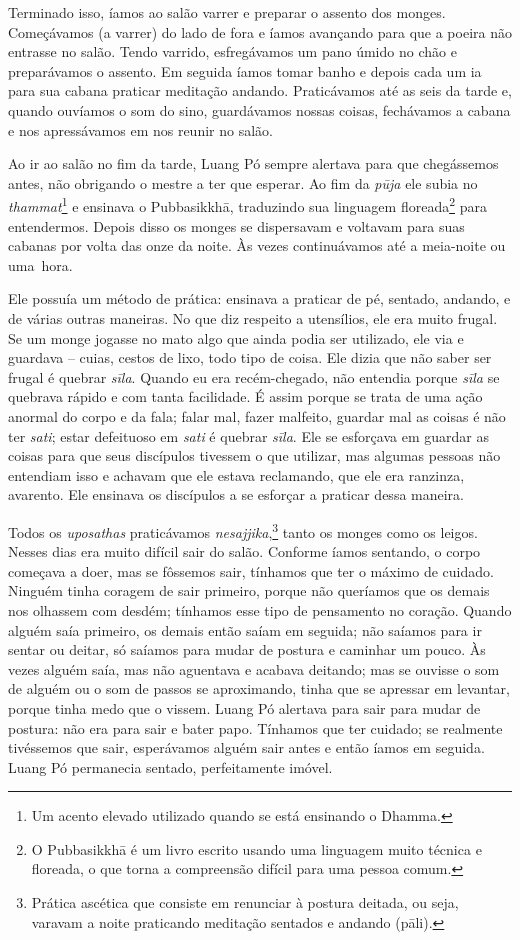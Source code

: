 Terminado isso, íamos ao salão varrer e preparar o assento dos monges.
Começávamos (a varrer) do lado de fora e íamos avançando para que a
poeira não entrasse no salão. Tendo varrido, esfregávamos um pano úmido
no chão e preparávamos o assento. Em seguida íamos tomar banho e depois
cada um ia para sua cabana praticar meditação andando. Praticávamos até
as seis da tarde e, quando ouvíamos o som do sino, guardávamos nossas
coisas, fechávamos a cabana e nos apressávamos em nos reunir no salão.

Ao ir ao salão no fim da tarde, Luang Pó sempre alertava para que
chegássemos antes, não obrigando o mestre a ter que esperar. Ao fim da
\emph{pūja} ele subia no \emph{thammat}\footnote{Um acento elevado
  utilizado quando se está ensinando o Dhamma.} e ensinava o
Pubbasikkhā, traduzindo sua linguagem floreada\footnote{O Pubbasikkhā é
  um livro escrito usando uma linguagem muito técnica e floreada, o que
  torna a compreensão difícil para uma pessoa comum.} para entendermos.
Depois disso os monges se dispersavam e voltavam para suas cabanas por
volta das onze da noite. Às vezes continuávamos até a meia-noite ou
uma~hora.

Ele possuía um método de prática: ensinava a praticar de pé, sentado,
andando, e de várias outras maneiras. No que diz respeito a utensílios,
ele era muito frugal. Se um monge jogasse no mato algo que ainda podia
ser utilizado, ele via e guardava -- cuias, cestos de lixo, todo tipo de
coisa. Ele dizia que não saber ser frugal é quebrar \emph{sīla}. Quando
eu era recém-chegado, não entendia porque \emph{sīla} se quebrava rápido
e com tanta facilidade. É assim porque se trata de uma ação anormal do
corpo e da fala; falar mal, fazer malfeito, guardar mal as coisas é não
ter \emph{sati}; estar defeituoso em \emph{sati} é quebrar \emph{sīla}.
Ele se esforçava em guardar as coisas para que seus discípulos tivessem
o que utilizar, mas algumas pessoas não entendiam isso e achavam que ele
estava reclamando, que ele era ranzinza, avarento. Ele ensinava os
discípulos a se esforçar a praticar dessa maneira.

Todos os \emph{uposathas} praticávamos \emph{nesajjika},\footnote{Prática
  ascética que consiste em renunciar à postura deitada, ou seja, varavam
  a noite praticando meditação sentados e andando (pāli).} tanto
os monges como os leigos. Nesses dias era muito difícil sair do salão.
Conforme íamos sentando, o corpo começava a doer, mas se fôssemos sair,
tínhamos que ter o máximo de cuidado. Ninguém tinha coragem de sair
primeiro, porque não queríamos que os demais nos olhassem com desdém;
tínhamos esse tipo de pensamento no coração. Quando alguém saía
primeiro, os demais então saíam em seguida; não saíamos para ir sentar
ou deitar, só saíamos para mudar de postura e caminhar um pouco. Às
vezes alguém saía, mas não aguentava e acabava deitando; mas se ouvisse
o som de alguém ou o som de passos se aproximando, tinha que se apressar
em levantar, porque tinha medo que o vissem. Luang Pó alertava para sair
para mudar de postura: não era para sair e bater papo. Tínhamos que ter
cuidado; se realmente tivéssemos que sair, esperávamos alguém sair antes
e então íamos em seguida. Luang Pó permanecia sentado, perfeitamente
imóvel.

